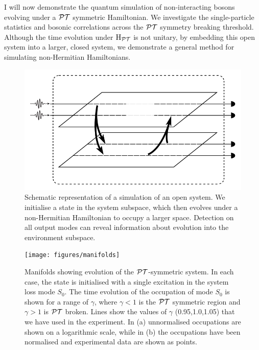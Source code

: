 I will now demonstrate the quantum simulation of non-interacting bosons
evolving under a \(\mathcal{PT}{}\) symmetric
Hamiltonian. We investigate the single-particle statistics and bosonic
correlations across the \(\mathcal{PT}{}\) symmetry breaking threshold. Although the time
evolution under \(\mathrm{H}_{\mathcal{PT}{}}\) is not unitary, by embedding this open
system into a larger, closed system, we demonstrate a general method for
simulating non-Hermitian Hamiltonians.

\begin{figure}[t]
  \centering
  \includegraphics{figures/opensystem}
  \caption[Representation of an open system]
  {Schematic representation of a simulation of an open system. We initialise a
  state in the system subspace, which then evolves under a non-Hermitian
  Hamiltonian to occupy a larger space. Detection on all output modes can reveal
  information about evolution into the environment subspace.}
  \label{fig:opensystem}
\end{figure}

\begin{figure}[t]
  \centering
  \texttt{[image: figures/manifolds]}
  \caption[Manifolds showing evolution of the PT-symmetric system]
  {Manifolds showing evolution of the \(\mathcal{PT}{}\)-symmetric system. In each case,
  the state is initialised with a single excitation in the system loss mode
  \(S_{0}\). The time evolution of the occupation of mode \(S_{0}\) is shown
  for a range of \(\gamma\), where \(\gamma < 1\) is the \(\mathcal{PT}\) symmetric
  region and \(\gamma > 1\) is \(\mathcal{PT}\) broken. Lines show the values of
  \(\gamma\) (0.95,1.0,1.05) that we have used in the experiment. In (a)
  unnormalised occupations are shown on a logarithmic scale, while in (b) the
  occupations have been normalised and experimental data are shown as points.}
  \label{fig:manifolds}
\end{figure}

